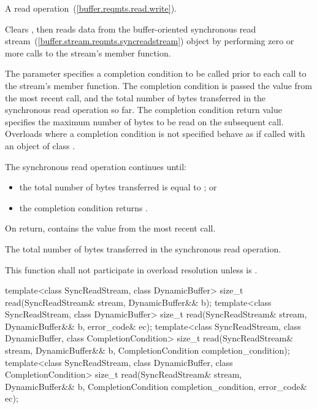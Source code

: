 \begin{itemdescr}
\pnum
A read operation~(\ref{buffer.reqmts.read.write}).

\pnum
\effects Clears , then reads data from the buffer-oriented synchronous read stream~(\ref{buffer.stream.reqmts.syncreadstream}) object  by performing zero or more calls to the stream's  member function.

\pnum
The  parameter specifies a completion condition to be called prior to each call to the stream's  member function. The completion condition is passed the  value from the most recent  call, and the total number of bytes transferred in the synchronous read operation so far. The completion condition return value specifies the maximum number of bytes to be read on the subsequent  call. Overloads where a completion condition is not specified behave as if called with an object of class .

\pnum
The synchronous read operation continues until:

\begin{itemize}
\item
the total number of bytes transferred is equal to ; or
\item
the completion condition returns .
\end{itemize}

\pnum
On return,  contains the  value from the most recent  call.

\pnum
\returns The total number of bytes transferred in the synchronous read operation.

\pnum
\remarks This function shall not participate in overload resolution unless  is .
\end{itemdescr}

%
\begin{itemdecl}
template<class SyncReadStream, class DynamicBuffer>
  size_t read(SyncReadStream& stream, DynamicBuffer&& b);
template<class SyncReadStream, class DynamicBuffer>
  size_t read(SyncReadStream& stream, DynamicBuffer&& b, error_code& ec);
template<class SyncReadStream, class DynamicBuffer,
  class CompletionCondition>
    size_t read(SyncReadStream& stream, DynamicBuffer&& b,
                CompletionCondition completion_condition);
template<class SyncReadStream, class DynamicBuffer,
  class CompletionCondition>
    size_t read(SyncReadStream& stream, DynamicBuffer&& b,
                CompletionCondition completion_condition,
                error_code& ec);
\end{itemdecl}

